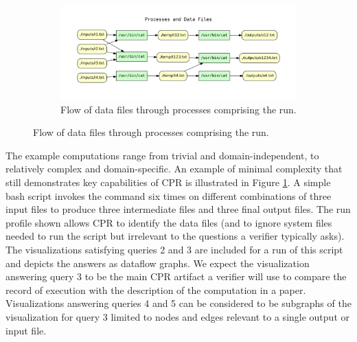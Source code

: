 \begin{figure}[h!]
\begin{subfigure}[b]{1.0\linewidth}
    \end{subfigure}

    \begin{subfigure}[b]{1.0\linewidth}
        \includegraphics[width=\linewidth]{cpr_processes_and_data_files.pdf}
        \setlength{\abovecaptionskip}{-5pt}
        \caption{Flow of data files through processes comprising the run.}
    \end{subfigure}
    
    \label{fig:cpr-example}
\end{figure}

The example computations range from trivial and domain-independent, to relatively complex and domain-specific. An example of minimal complexity that still demonstrates key capabilities of CPR is illustrated in Figure \ref{fig:cpr-example}. A simple bash script invokes the  command six times on different combinations of three input files to produce three intermediate files and three final output files. The run profile shown allows CPR to identify the data files (and to ignore system files needed to run the script but irrelevant to the questions a verifier typically asks).  The visualizations satisfying queries 2 and 3 are included for a run of this script and depicts the answers as dataflow graphs. We expect the visualization answering query 3 to be the main CPR artifact a verifier will use to compare the record of execution with the description of the computation in a paper. Visualizations answering queries 4 and 5 can be considered to be subgraphs of the visualization for query 3 limited to nodes and edges relevant to a single output or input file. 



